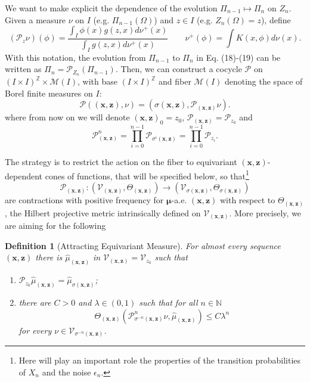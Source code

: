 \documentclass{article}
\newcommand{\1}{\mathbbm{1}}
\newcommand{\bo}{\boldsymbol}
\newcommand{\N}{\mathbb N}
\newcommand{\Z}{\mathbb Z}
\newcommand{\mc}{\mathcal}
\newtheorem{definition}{Definition}[section]
\begin{document}
We want to make explicit the dependence of the evolution $\Pi_{n-1}\mapsto \Pi_{n}$ on $Z_n$. Given a measure $\nu$ on $I$ (e.g.   $\Pi_{n-1}(\Omega)$) and $z\in I$ (e.g.   $Z_{n}(\Omega)=z$), define
\begin{equation}\label{Eq:Evolution}
(\mc P_z\nu)(\phi)= \frac{\int _I\phi(x)g(z,x)d\nu^+(x)}{\int _Ig(z,x)d\nu^+(x)}\quad\quad \nu^+(\phi)=\int K(x,\phi)d\nu(x).
\end{equation}
With this notation, the evolution from $\Pi_{n-1}$ to $\Pi_{n}$ in Eq. (18)-(19) can be written as $\Pi_{n}=\mc P_{Z_n}(\Pi_{n-1})$. Then, we can construct a cocycle $\mc P$ on $(I\times I)^\Z\times \mc M(I)$, with base $(I\times I)^\Z$ and fiber $\mc M(I)$  denoting the space of Borel finite measures on $I$:
\begin{equation}\label{Eq:CocycleDef}
\mc P((\bo x,\bo z), \nu)=(\sigma(\bo x,\bo z),\mc P_{(\bo x,\bo z)}\nu).
\end{equation}
where from now on we will denote $(\bo x, \bo z)_0=z_0$, $\mc P_{(\bo x,\bo z)}=\mc P_{z_0}$ and \[
\mc P^n_{(\bo x,\bo z)}=\prod_{i=0}^{n-1}\mc P_{\sigma^i(\bo x,\bo z)}=\prod_{i=0}^{n-1}\mc P_{z_i}.
\]

The strategy is to restrict the action on the fiber to equivariant $(\bo x,\bo z)$-dependent cones of functions, that will be specified below,  so that\footnote{Here will play an important role the properties of the transition probabilities of $X_n$ and the noise $\epsilon_n$. } \[
\mc P_{(\bo x,\bo z)}:(\mc V_{(\bo x,\bo z)},\Theta_{(\bo x,\bo z)})\rightarrow (\mc V_{\sigma (\bo x,\bo z)},\Theta_{\sigma (\bo x,\bo z)})\]
are  contractions with positive frequency for $\bo \mu$-a.e. $(\bo x,\bo z)$ with respect to $\Theta_{(\bo x,\bo z)}$, the Hilbert projective metric intrinsically defined on $\mc V_{(\bo x,\bo z)}$.
More precisely, we are aiming for the following 
\begin{definition}[Attracting Equivariant Measure]For almost every sequence $(\bo x,\bo z)$ there is $\hat \mu_{(\bo x,\bo z)}$ in $\mc V_{(\bo x,\bo z)}=\mc V_{z_0}$ such that
\begin{enumerate}
\item $\mc P_{z_0}\hat \mu_{(\bo x,\bo z)}=\hat \mu_{\sigma(\bo x,\bo z)}$;
\item there are $C>0$ and $\lambda\in(0,1)$ such that for all $n\in \N$
\[
 \Theta_{(\bo x,\bo z)}\left(\mc P^n_{\sigma^{-n}(\bo x,\bo z)}\nu,\hat \mu_{(\bo x,\bo z)} \right)\le C\lambda^n
\]
 for every $\nu\in \mc V_{\sigma^{-n}(\bo x,\bo z)}$.
\end{enumerate}
\end{definition}
\end{document}
